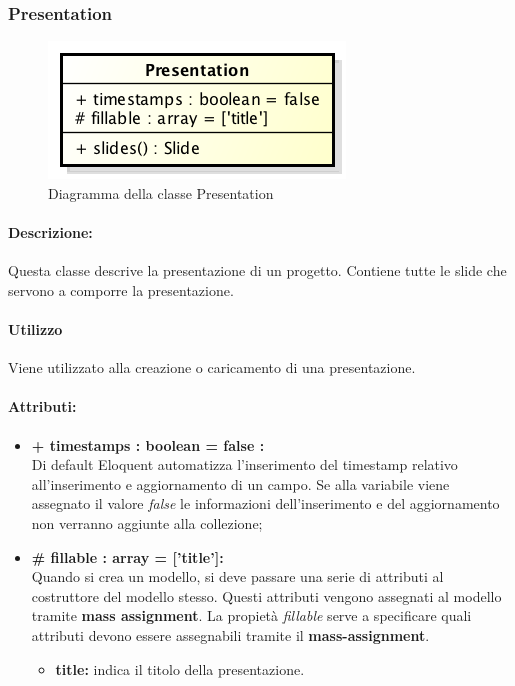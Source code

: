 \subsubsection{Presentation}

	\begin{figure}[h]
		\centering
		\includegraphics[width=0.5\linewidth]{img/back_end_premi_model_presentation}
		\caption[Diagramma della classe Presentation]{Diagramma della classe Presentation}
		\label{fig:back_end_premi_model_presentation}
	\end{figure}


	\paragraph{Descrizione:}
	Questa classe descrive la presentazione di un progetto. Contiene tutte le slide che servono a comporre la presentazione.

	\paragraph{Utilizzo}
	Viene utilizzato alla creazione o caricamento di una presentazione.
	
	\paragraph{Attributi:}
	\begin{itemize}
		\item \textbf{+ timestamps : boolean = false :}\\
		Di default Eloquent automatizza l'inserimento del timestamp relativo all'inserimento e aggiornamento di un campo. Se alla variabile viene assegnato il valore \textit{false} le informazioni dell'inserimento e del aggiornamento non verranno aggiunte alla collezione;
		\item \textbf{\# fillable : array = ['title']:}\\
		Quando si crea un modello, si deve passare una serie di attributi al costruttore del modello stesso. Questi attributi vengono assegnati al modello tramite \textbf{mass assignment}. La propietà \textit{fillable} serve a specificare quali attributi devono essere assegnabili tramite il \textbf{mass-assignment}.
		\begin{itemize}
			\item \textbf{title:} indica il titolo della presentazione.
		\end{itemize}
	\end{itemize}

